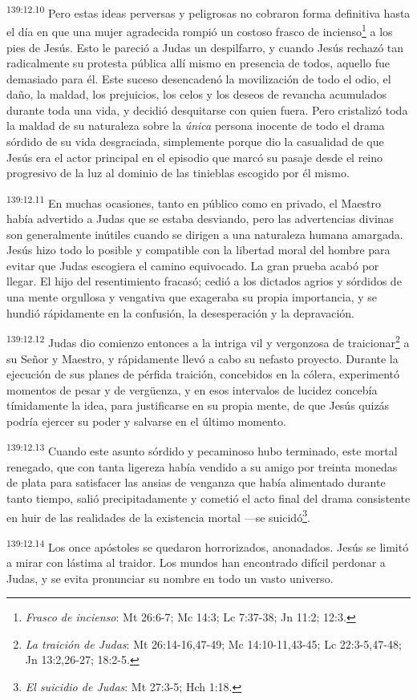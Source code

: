 \par
\textsuperscript{139:12.10} Pero estas ideas perversas y peligrosas no cobraron forma definitiva hasta el día en que una mujer agradecida rompió un costoso frasco de incienso\footnote{\textit{Frasco de incienso}: Mt 26:6-7; Mc 14:3; Lc 7:37-38; Jn 11:2; 12:3.} a los pies de Jesús. Esto le pareció a Judas un despilfarro, y cuando Jesús rechazó tan radicalmente su protesta pública allí mismo en presencia de todos, aquello fue demasiado para él. Este suceso desencadenó la movilización de todo el odio, el daño, la maldad, los prejuicios, los celos y los deseos de revancha acumulados durante toda una vida, y decidió desquitarse con quien fuera. Pero cristalizó toda la maldad de su naturaleza sobre la \textit{única} persona inocente de todo el drama sórdido de su vida desgraciada, simplemente porque dio la casualidad de que Jesús era el actor principal en el episodio que marcó su pasaje desde el reino progresivo de la luz al dominio de las tinieblas escogido por él mismo.

\par
\textsuperscript{139:12.11} En muchas ocasiones, tanto en público como en privado, el Maestro había advertido a Judas que se estaba desviando, pero las advertencias divinas son generalmente inútiles cuando se dirigen a una naturaleza humana amargada. Jesús hizo todo lo posible y compatible con la libertad moral del hombre para evitar que Judas escogiera el camino equivocado. La gran prueba acabó por llegar. El hijo del resentimiento fracasó; cedió a los dictados agrios y sórdidos de una mente orgullosa y vengativa que exageraba su propia importancia, y se hundió rápidamente en la confusión, la desesperación y la depravación.

\par
\textsuperscript{139:12.12} Judas dio comienzo entonces a la intriga vil y vergonzosa de traicionar\footnote{\textit{La traición de Judas}: Mt 26:14-16,47-49; Mc 14:10-11,43-45; Lc 22:3-5,47-48; Jn 13:2,26-27; 18:2-5.} a su Señor y Maestro, y rápidamente llevó a cabo su nefasto proyecto. Durante la ejecución de sus planes de pérfida traición, concebidos en la cólera, experimentó momentos de pesar y de verg\"uenza, y en esos intervalos de lucidez concebía tímidamente la idea, para justificarse en su propia mente, de que Jesús quizás podría ejercer su poder y salvarse en el último momento.

\par
\textsuperscript{139:12.13} Cuando este asunto sórdido y pecaminoso hubo terminado, este mortal renegado, que con tanta ligereza había vendido a su amigo por treinta monedas de plata para satisfacer las ansias de venganza que había alimentado durante tanto tiempo, salió precipitadamente y cometió el acto final del drama consistente en huir de las realidades de la existencia mortal ---se suicidó\footnote{\textit{El suicidio de Judas}: Mt 27:3-5; Hch 1:18.}.

\par
\textsuperscript{139:12.14} Los once apóstoles se quedaron horrorizados, anonadados. Jesús se limitó a mirar con lástima al traidor. Los mundos han encontrado difícil perdonar a Judas, y se evita pronunciar su nombre en todo un vasto universo.